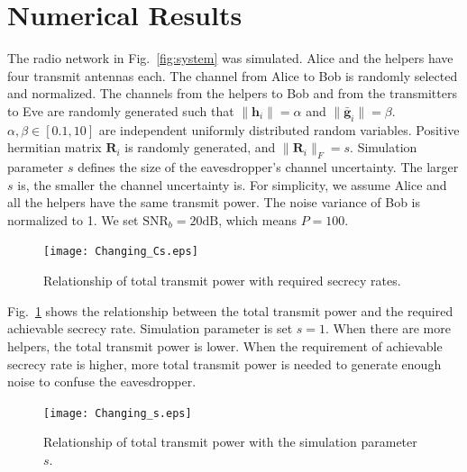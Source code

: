 \documentclass[journal]{IEEEtran}
\begin{document}
\section{Numerical Results} \label{sec:numerical results}
The radio network in Fig.~\ref{fig:system} was simulated. Alice and the helpers have four transmit antennas each. The channel from Alice to Bob is randomly selected and normalized. The channels from the helpers to Bob and from the transmitters to Eve are randomly generated such that $\|\mathbf{h}_i\| = \alpha$ and $\|\bar{\mathbf{g}}_i\| = \beta$. $\alpha,\beta\in  [0.1,10]$ are independent uniformly distributed random variables.
Positive hermitian matrix $\mathbf{R}_i$ is randomly generated, and $\|\mathbf{R}_i\|_F = s$. Simulation parameter $s$ defines the size of the eavesdropper's channel uncertainty. The larger $s$ is, the smaller the channel uncertainty is. 
For simplicity, we assume Alice and all the helpers have the same transmit power. 
The noise variance of Bob is normalized to 1. We set $\mathrm{SNR}_b = 20 \mathrm{dB}$, which means $P = 100$.


\begin{figure}[!ht]
	\centering
	\texttt{[image: Changing\_Cs.eps]} %
	\caption{Relationship of total transmit power with required secrecy rates.}
	\label{fig:Changing_Cs}
\end{figure}

Fig.~\ref{fig:Changing_Cs} shows the relationship between the total transmit power and the required achievable secrecy rate. Simulation parameter is set $s = 1$. When there are more helpers, the total transmit power is lower. 
When the requirement of achievable secrecy rate is higher, more total transmit power is needed to generate enough noise to confuse the eavesdropper. %

\begin{figure}[!ht]
	\centering
	\texttt{[image: Changing\_s.eps]} %
	\caption{Relationship of total transmit power with the simulation parameter $s$.}
	\label{fig:Changing_s}
\end{figure}
\end{document}

